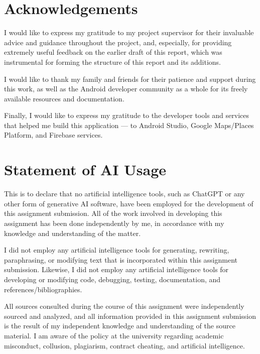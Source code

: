 \documentclass[12pt, a4paper]{article}
\begin{document}
\section*{Acknowledgements}

I would like to express my gratitude to my project supervisor for their invaluable advice and guidance throughout the project, and, especially, for providing extremely useful feedback on the earlier draft of this report, which was instrumental for forming the structure of this report and its additions.

I would like to thank my family and friends for their patience and support during this work, as well as the Android developer community as a whole for its freely available resources and documentation.

Finally, I would like to express my gratitude to the developer tools and services that helped me build this application --- to Android Studio, Google Maps/Places Platform, and Firebase services.

\newpage
\section*{Statement of AI Usage}

This is to declare that no artificial intelligence tools, such as ChatGPT or any other form of generative AI software, have been employed for the development of this assignment submission. All of the work involved in developing this assignment has been done independently by me, in accordance with my knowledge and understanding of the matter.

I did not employ any artificial intelligence tools for generating, rewriting, paraphrasing, or modifying text that is incorporated within this assignment submission. Likewise, I did not employ any artificial intelligence tools for developing or modifying code, debugging, testing, documentation, and references/bibliographies.

All sources consulted during the course of this assignment were independently sourced and analyzed, and all information provided in this assignment submission is the result of my independent knowledge and understanding of the source material. I am aware of the policy at the university regarding academic misconduct, collusion, plagiarism, contract cheating, and artificial intelligence.
\end{document}
